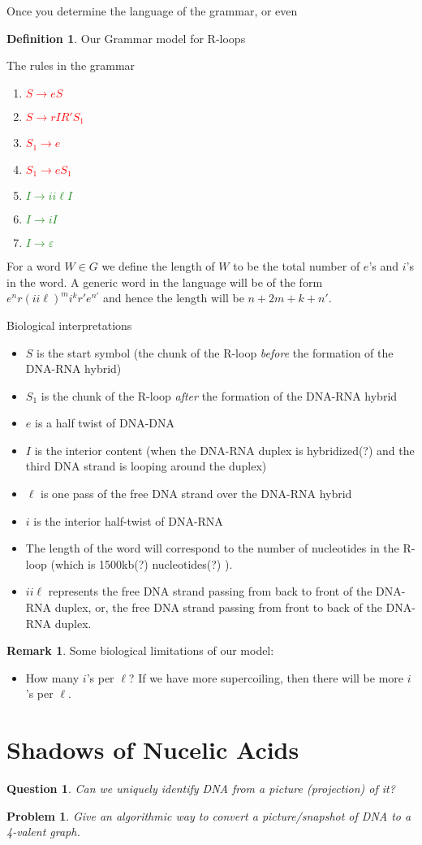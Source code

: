 \documentclass[usenames,dvipsnames]{article}
\theoremstyle{plain}
\newtheorem{ques}[theorem]{Question}
\newtheorem{prob}[theorem]{Problem}
\theoremstyle{definition}
\newtheorem{defn}[theorem]{Definition}
\newtheorem{rmk}[theorem]{Remark}
\newcommand{\red}[1]{\textbf{\textcolor{red}{#1}}}
\newcommand{\green}[1]{\textbf{\textcolor{ForestGreen}{#1}}}
\begin{document}
Once you determine the language of the grammar, or even 
\begin{defn}
Our Grammar model for R-loops

The rules in the grammar
\begin{enumerate}
    \item \red{$S\rightarrow eS$}
    \item \red{$S\rightarrow rIR'S_1$}
    \item \red{$S_1\rightarrow e$}
    \item \red{$S_1\rightarrow e S_1$}
    \item \green{$I\rightarrow ii\ell I$}
    \item \green{$I\rightarrow iI$}
    \item \green{$I\rightarrow \varepsilon$}
\end{enumerate}

For a word $W\in G$ we define the length of $W$ to be the total number of $e$'s and $i$'s in the word. A generic word in the language will be of the form
$e^n r (ii\ell)^m i^k r' e^{n'}$
and hence the length will be $n + 2m + k + n'$.
\end{defn}

Biological interpretations
\begin{itemize}
    \item $S$ is the start symbol (the chunk of the R-loop \emph{before} the formation of the DNA-RNA hybrid)
    \item $S_1$ is the chunk of the R-loop \emph{after} the formation of the DNA-RNA hybrid
    \item $e$ is a half twist of DNA-DNA
    \item $I$ is the interior content (when the DNA-RNA duplex is hybridized(?) and the third DNA strand is looping around the duplex)
    \item $\ell$ is one pass of the free DNA strand over the DNA-RNA hybrid
    \item $i$ is the interior half-twist of DNA-RNA
    \item The length of the word will correspond to the number of nucleotides in the R-loop (which is 1500kb(?) nucleotides(?) \cite{}).
    \item $ii\ell$ represents the free DNA strand passing from back to front of the DNA-RNA duplex, or, the free DNA strand passing from front to back of the DNA-RNA duplex.
\end{itemize}

\begin{rmk}
Some biological limitations of our model:
\begin{itemize}
    \item How many $i$'s per $\ell$? If we have more supercoiling, then there will be more $i$'s per $\ell$.
\end{itemize}
\end{rmk}


\section{Shadows of Nucelic Acids}

\begin{ques}
Can we uniquely identify DNA from a picture (projection) of it?
\end{ques}

\begin{prob}
Give an algorithmic way to convert a picture/snapshot of DNA to a 4-valent graph.
\end{prob}
\end{document}
